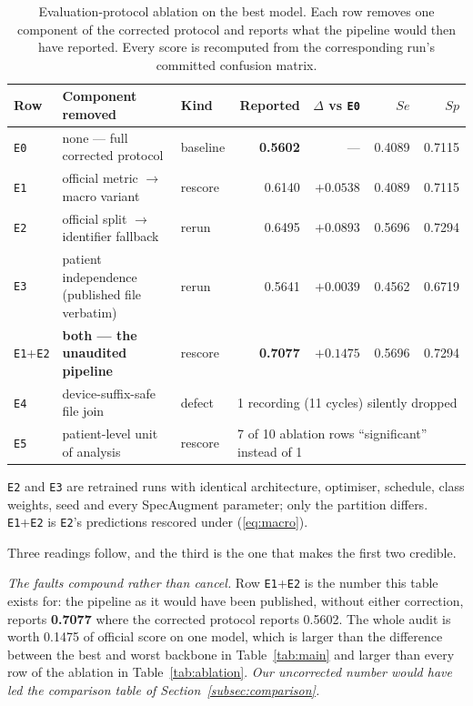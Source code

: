 \documentclass[journal,onecolumn]{IEEEtran}
\newcommand{\best}[1]{\textbf{#1}}
\begin{document}
\begin{table}[!t]
\centering
\caption{Evaluation-protocol ablation on the best model. Each row removes one
component of the corrected protocol and reports what the pipeline would then have
reported. Every score is recomputed from the corresponding run's committed
confusion matrix.}
\label{tab:protocol}
\small
\begin{tabular}{lllrrrr}
\toprule
Row & Component removed & Kind & Reported & $\Delta$ vs \texttt{E0} & $Se$ & $Sp$ \\
\midrule
\texttt{E0} & none --- full corrected protocol & baseline & \best{0.5602} & --- & 0.4089 & 0.7115 \\
\texttt{E1} & official metric $\rightarrow$ macro variant & rescore & 0.6140 & $+0.0538$ & 0.4089 & 0.7115 \\
\texttt{E2} & official split $\rightarrow$ identifier fallback & rerun & 0.6495 & $+0.0893$ & 0.5696 & 0.7294 \\
\texttt{E3} & patient independence (published file verbatim) & rerun & 0.5641 & $+0.0039$ & 0.4562 & 0.6719 \\
\texttt{E1}+\texttt{E2} & \best{both --- the unaudited pipeline} & rescore & \best{0.7077} & $\mathbf{+0.1475}$ & 0.5696 & 0.7294 \\
\midrule
\texttt{E4} & device-suffix-safe file join & defect & \multicolumn{4}{l}{1 recording (11 cycles) silently dropped} \\
\texttt{E5} & patient-level unit of analysis & rescore & \multicolumn{4}{l}{7 of 10 ablation rows ``significant'' instead of 1} \\
\bottomrule
\end{tabular}

\vspace{2pt}
\footnotesize \texttt{E2} and \texttt{E3} are retrained runs with identical
architecture, optimiser, schedule, class weights, seed and every SpecAugment
parameter; only the partition differs. \texttt{E1}+\texttt{E2} is \texttt{E2}'s
predictions rescored under (\ref{eq:macro}).
\end{table}

Three readings follow, and the third is the one that makes the first two
credible.

\emph{The faults compound rather than cancel.} Row \texttt{E1}+\texttt{E2} is the
number this table exists for: the pipeline as it would have been published,
without either correction, reports \best{0.7077} where the corrected protocol
reports 0.5602. The whole audit is worth 0.1475 of official score on one model,
which is larger than the difference between the best and worst backbone in
Table~\ref{tab:main} and larger than every row of the ablation in
Table~\ref{tab:ablation}. \emph{Our uncorrected number would have led the
comparison table of Section~\ref{subsec:comparison}.}
\end{document}
